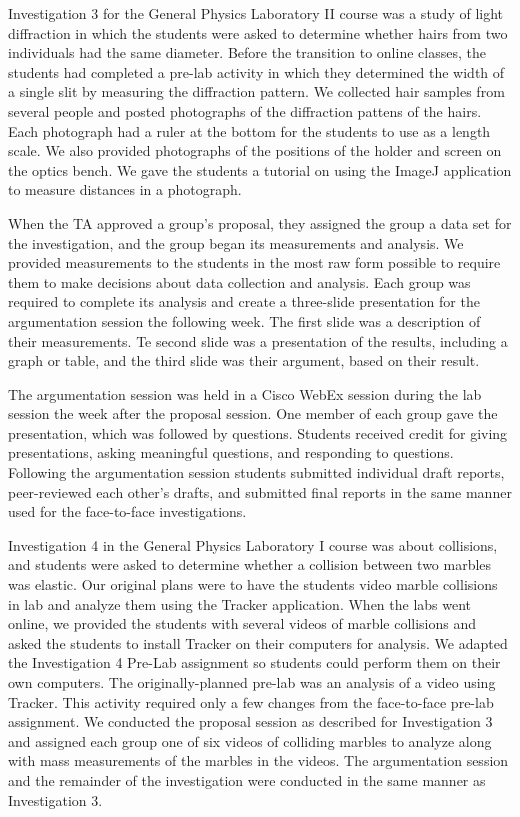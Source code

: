 \documentclass[aip, numerical, preprint]{revtex4-2}
\begin{document}
Investigation 3 for the General Physics Laboratory II course was a study of light diffraction in which the students were asked to determine whether hairs from two individuals had the same diameter. Before the transition to online classes, the students had completed a pre-lab activity in which they determined the width of a single slit by measuring the diffraction pattern. We collected hair samples from several people and posted photographs of the diffraction pattens of the hairs. Each photograph had a ruler at the bottom for the students to use as a length scale. We also provided photographs of the positions of the holder and screen on the optics bench. We gave the students a tutorial on using the ImageJ application\citep{schrasetal12} to measure distances in a photograph.

When the TA approved a group's  proposal, they assigned the group a data set for the investigation, and the group began its measurements and analysis. We provided measurements to the students in the most raw form possible to require them to make decisions about data collection and analysis. Each group was required to complete its analysis and create a three-slide presentation for the argumentation session the following week. The first slide was a description of their measurements. Te second slide was a presentation of the results, including a graph or table, and the third slide was their argument, based on their result.

The argumentation session was held in a Cisco WebEx session during the lab session the week after the proposal session. One member of each group gave the presentation, which  was followed by questions. Students received credit for giving presentations, asking meaningful questions, and responding to questions.  Following the argumentation session students submitted individual draft reports, peer-reviewed each other's drafts, and submitted final reports in the same manner used for the face-to-face investigations.

Investigation 4 in the General Physics Laboratory I course was about collisions, and students were asked to determine whether a collision between two marbles was elastic. Our original plans were to have the students video marble collisions in lab and analyze them using the Tracker application\citep{bro2009}. When the labs went online, we provided the students with several videos of marble collisions and asked the students to install Tracker on their computers for analysis.  We adapted the Investigation 4 Pre-Lab assignment so students could perform them on their own computers. The originally-planned pre-lab was an analysis of a video using Tracker. This activity required only a few changes from the face-to-face pre-lab assignment. We conducted the proposal session as described for Investigation 3 and assigned each group one of six videos of colliding marbles to analyze along with mass measurements of the marbles in the videos. The argumentation session and the remainder of the investigation were conducted in the same manner as Investigation 3.
\end{document}
